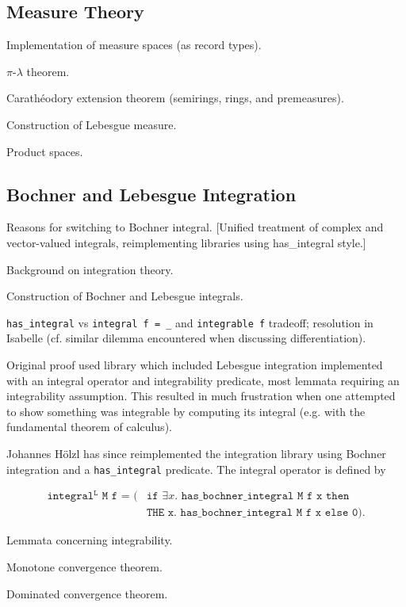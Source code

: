\documentclass{amsart}
\theoremstyle{definition}
\theoremstyle{remark}
\begin{document}
\subsection{Measure Theory}

Implementation of measure spaces (as record types).

$\pi$-$\lambda$ theorem.

Carath\'eodory extension theorem (semirings, rings, and premeasures).

Construction of Lebesgue measure.

Product spaces.

\subsection{Bochner and Lebesgue Integration}

Reasons for switching to Bochner integral. [Unified treatment of complex and vector-valued integrals, reimplementing libraries using has\_integral style.]

Background on integration theory.

Construction of Bochner and Lebesgue integrals.

\texttt{has\_integral} vs \texttt{integral f = \_} and \texttt{integrable f} tradeoff; resolution in Isabelle (cf. similar dilemma encountered when discussing differentiation).

Original proof used library which included Lebesgue integration implemented with an integral operator and integrability predicate, most lemmata requiring an integrability assumption. This resulted in much frustration when one attempted to show something was integrable by computing its integral (e.g. with the fundamental theorem of calculus).

Johannes H\"olzl has since reimplemented the integration library using Bochner integration and a \texttt{has\_integral} predicate. The integral operator is defined by

\begin{align*} \texttt{integral$^\texttt{L}$ M f = (}&\texttt{if $\exists x.$ has\_bochner\_integral M f x then} \\
  &\texttt{THE x. has\_bochner\_integral M f x else 0)}.
\end{align*}

Lemmata concerning integrability.

Monotone convergence theorem.

Dominated convergence theorem.
\end{document}
